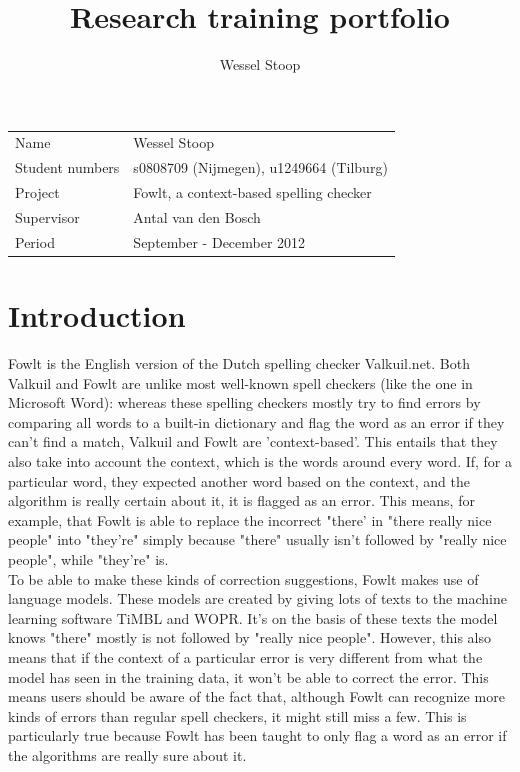 \documentclass[12pt]{article}
\title{Research training portfolio}
\author{Wessel Stoop}
\let\stdsection\section
\renewcommand\section{\newpage\stdsection}
\begin{document}
\maketitle

\begin{table}[h]
\begin{tabular}{ll}
Name&Wessel Stoop\\
Student numbers&s0808709 (Nijmegen), u1249664 (Tilburg)\\
Project&Fowlt, a context-based spelling checker\\
Supervisor&Antal van den Bosch\\
Period&September - December 2012\\
\end{tabular}
\end{table}

\section{Introduction}
Fowlt is the English version of the Dutch spelling checker Valkuil.net. Both Valkuil and Fowlt are unlike most well-known spell checkers (like the one in Microsoft Word): whereas these spelling checkers mostly try to find errors by comparing all words to a built-in dictionary and flag the word as an error if they can't find a match, Valkuil and Fowlt are 'context-based'. This entails that they also take into account the context, which is the words around every word. If, for a particular word, they expected another word based on the context, and the algorithm is really certain about it, it is flagged as an error. This means, for example, that Fowlt is able to replace the incorrect "there' in "there really nice people" into "they're" simply because "there" usually isn't followed by "really nice people", while "they're" is. 
\\\indent
To be able to make these kinds of correction suggestions, Fowlt makes use of language models. These models are created by giving lots of texts to the machine learning software TiMBL and WOPR. It's on the basis of these texts the model knows "there" mostly is not followed by "really nice people". However, this also means that if the context of a particular error is very different from what the model has seen in the training data, it won't be able to correct the error. This means users should be aware of the fact that, although Fowlt can recognize more kinds of errors than regular spell checkers, it might still miss a few. This is particularly true because Fowlt has been taught to only flag a word as an error if the algorithms are really sure about it.
\end{document}
